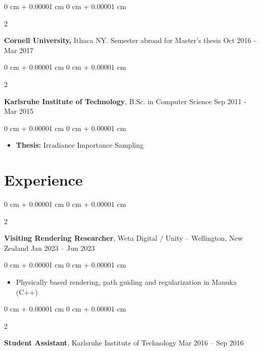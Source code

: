 \documentclass[10pt, letterpaper]{article}
\newenvironment{highlights}{
    \begin{itemize}[
        topsep=0.10 cm,
        parsep=0.10 cm,
        partopsep=0pt,
        itemsep=0pt,
        leftmargin=0 cm + 10pt
    ]
}{
    \end{itemize}
} %
\newenvironment{onecolentry}{
    \begin{adjustwidth}{
        0 cm + 0.00001 cm
    }{
        0 cm + 0.00001 cm
    }
}{
    \end{adjustwidth}
} %
\newenvironment{twocolentry}[2][]{
    \onecolentry
    \def\secondColumn{#2}
    \setcolumnwidth{\fill, 4.5 cm}
    \begin{paracol}{2}
}{
    \switchcolumn \raggedleft \secondColumn
    \end{paracol}
    \endonecolentry
} %
\begin{document}
        \educspace   
        
        \begin{twocolentry}{
            Oct 2016 - Mar 2017
        }
            \textbf{Cornell University,} Ithaca NY. Semester abroad for Master's thesis\end{twocolentry}

        \educspace

        \begin{twocolentry}{
            Sep 2011 - Mar 2015
        }
            \textbf{Karlsruhe Institute of Technology}, B.Sc. in Computer Science\end{twocolentry}

        \vspace{0.10 cm}
        \begin{onecolentry}
            \begin{highlights}
            \item \textbf{Thesis:} Irradiance Importance Sampling
            \end{highlights}
        \end{onecolentry}

    
    \sectionspace
    \section{Experience}
      \sectspacetop
        \begin{twocolentry}{
            Jan 2023 – Jun 2023
        }
            \textbf{Visiting Rendering Researcher}, Weta Digital / Unity -- Wellington, New Zealand\end{twocolentry}

        \vspace{0.10 cm}
        \begin{onecolentry}
            \begin{highlights}
                \item Physically based rendering, path guiding and regularization in Manuka (C++)
            \end{highlights}
        \end{onecolentry}

        \expspace
      
        \begin{twocolentry}{
            Mar 2016 – Sep 2016
        }
            \textbf{Student Assistant}, Karlsruhe Institute of Technology\end{twocolentry}
\end{document}
